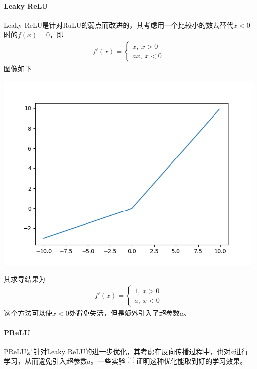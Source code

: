 \paragraph{Leaky ReLU}
Leaky ReLU是针对RuLU的弱点而改进的，其考虑用一个比较小的数去替代$x<0$时的$f(x)=0$，即
\begin{eqnarray}
f'(x)=
\left\lbrace
\begin{aligned}
x,\ x>0\\
ax,\ x<0
\end{aligned}
\right.
\end{eqnarray}
图像如下
\begin{center}
\includegraphics[scale=0.5]{../figures/NN7.png} 
\end{center}
其求导结果为
\begin{eqnarray}
f'(x)=
\left\lbrace
\begin{aligned}
1,\ x>0\\
a,\ x<0
\end{aligned}
\right.
\end{eqnarray}
这个方法可以使$x<0$处避免失活，但是额外引入了超参数$a$。
\paragraph{PReLU}PReLU是针对Leaky ReLU的进一步优化，其考虑在反向传播过程中，也对$a$进行学习，从而避免引入超参数$a$。一些实验$\ ^{[1]}$证明这种优化能取到好的学习效果。
